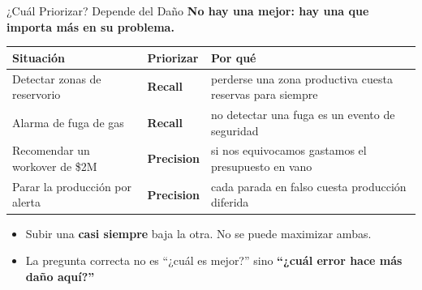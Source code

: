 \documentclass[aspectratio=169, 11pt]{beamer}
\begin{document}
\begin{frame}[shrink=8]{¿Cuál Priorizar? Depende del Daño}
  \vspace{-4pt}
  {\small\color{arcaDark}\bfseries
    No hay una mejor: hay una que importa \textbf{más en su problema}.}

  \vspace{5pt}
  \centering
  {\scriptsize
  \renewcommand{\arraystretch}{1.45}
  \begin{tabular}{@{}p{4.6cm} p{2.4cm} p{4.4cm}@{}}
    \toprule
    {\bfseries\color{arcaDark} Situación} & {\bfseries\color{arcaRed} Priorizar}
      & {\bfseries\color{arcaDark} Por qué} \\
    \midrule
    \rowcolor{arcaGray}
    Detectar zonas de reservorio & \textbf{Recall}
      & perderse una zona productiva cuesta reservas para siempre \\
    Alarma de fuga de gas & \textbf{Recall}
      & no detectar una fuga es un evento de seguridad \\
    \rowcolor{arcaGray}
    Recomendar un workover de \$2M & \textbf{Precision}
      & si nos equivocamos gastamos el presupuesto en vano \\
    Parar la producción por alerta & \textbf{Precision}
      & cada parada en falso cuesta producción diferida \\
    \bottomrule
  \end{tabular}
  }

  \vspace{7pt}
  {\footnotesize\color{textMuted}
  \begin{itemize}\setlength{\itemsep}{3pt}
    \item[{\color{arcaRed}\scriptsize\faExclamationTriangle}]
      Subir una \textbf{casi siempre} baja la otra. No se puede maximizar ambas.
    \item[{\color{codeGreen}\scriptsize\faCheck}]
      La pregunta correcta no es ``¿cuál es mejor?'' sino
      \textbf{``¿cuál error hace más daño aquí?''}
  \end{itemize}
  }
\end{frame}
\end{document}
